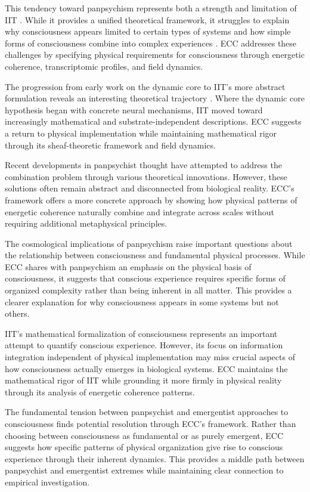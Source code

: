 \begin{refsection}
This tendency toward panpsychism represents both a strength and limitation of IIT \cite{Tononi2008}. While it provides a unified theoretical framework, it struggles to explain why consciousness appears limited to certain types of systems and how simple forms of consciousness combine into complex experiences \cite{Chalmers2015}. ECC addresses these challenges by specifying physical requirements for consciousness through energetic coherence, transcriptomic profiles, and field dynamics.

The progression from early work on the dynamic core to IIT's more abstract formulation reveals an interesting theoretical trajectory \cite{Tononi2016}. Where the dynamic core hypothesis began with concrete neural mechanisms, IIT moved toward increasingly mathematical and substrate-independent descriptions. ECC suggests a return to physical implementation while maintaining mathematical rigor through its sheaf-theoretic framework and field dynamics.

Recent developments in panpsychist thought \cite{Skrbina2017} have attempted to address the combination problem through various theoretical innovations. However, these solutions often remain abstract and disconnected from biological reality. ECC's framework offers a more concrete approach by showing how physical patterns of energetic coherence naturally combine and integrate across scales without requiring additional metaphysical principles.

The cosmological implications of panpsychism \cite{Shani2015} raise important questions about the relationship between consciousness and fundamental physical processes. While ECC shares with panpsychism an emphasis on the physical basis of consciousness, it suggests that conscious experience requires specific forms of organized complexity rather than being inherent in all matter. This provides a clearer explanation for why consciousness appears in some systems but not others.

IIT's mathematical formalization of consciousness \cite{Oizumi2014} represents an important attempt to quantify conscious experience. However, its focus on information integration independent of physical implementation may miss crucial aspects of how consciousness actually emerges in biological systems. ECC maintains the mathematical rigor of IIT while grounding it more firmly in physical reality through its analysis of energetic coherence patterns.

The fundamental tension between panpsychist and emergentist approaches to consciousness \cite{Goff2019} finds potential resolution through ECC's framework. Rather than choosing between consciousness as fundamental or as purely emergent, ECC suggests how specific patterns of physical organization give rise to conscious experience through their inherent dynamics. This provides a middle path between panpsychist and emergentist extremes while maintaining clear connection to empirical investigation.


\end{refsection}
